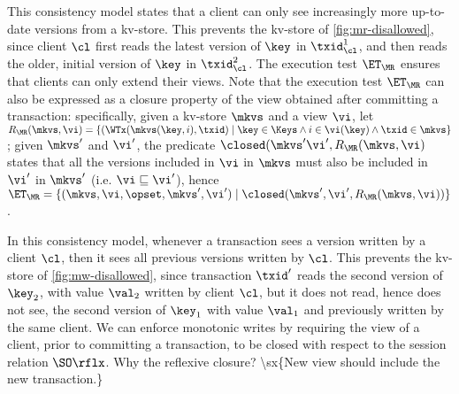 
This consistency model states that a client
can only see increasingly more up-to-date versions from a kv-store. 
This prevents \eg the kv-store of \cref{fig:mr-disallowed},
since client $\cl$ first reads the latest version of $\key$ in $\txid_{\cl}^{1}$, 
and then reads the older, initial version of $\key$ in $\txid_{\cl}^{2}$.  
The execution test $\ET_{\MR}$ ensures that clients  can only extend their views. 
Note that the execution test $\ET_{\MR}$ can also be expressed as a closure 
property of the view obtained after committing a transaction: 
specifically, given a kv-store $\mkvs$ and a view $\vi$, let 
$R_{\MR}(\mkvs, \vi) = \{(\WTx(\mkvs(\key, i), \txid) \mid \key \in \Keys \wedge i \in \vi(\key) 
\wedge \txid \in \mkvs\}$; given $\mkvs'$ and $\vi'$, 
the predicate $\closed(\mkvs' \vi', R_{\MR}(\mkvs, \vi)$ states that all the versions included in $\vi$ in $\mkvs$ 
must also be included in $\vi'$ in $\mkvs'$ (i.e. $\vi \sqsubseteq \vi'$), hence 
$\ET_{\MR} = \{(\mkvs, \vi, \opset, \mkvs', \vi') \mid \closed(\mkvs', \vi', 
R_{\MR}(\mkvs, \vi))\}$.

In this consistency model, whenever a transaction sees a version written by a client $\cl$,
then it sees all previous versions written by $\cl$. 
This prevents \eg the kv-store of \cref{fig:mw-disallowed}, since 
transaction $\txid'$ reads the second version of $\key_2$, 
with value $\val_2$ written by client $\cl$, 
but it does not read, hence does not see, the second version of $\key_1$
with value $\val_1$ and previously written by the same client. 
We can enforce monotonic writes by requiring the view of a client, prior to committing 
a transaction, to be closed with respect to the session relation $\SO\rflx$.
\ac{Why the reflexive closure? \sx{New view should include the new transaction.}}

